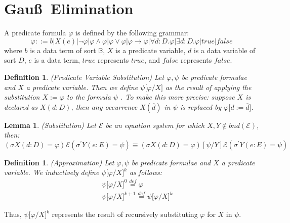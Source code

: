 \documentclass{article}
\newtheorem{definition}[theorem]{Definition}
\newtheorem{lemma}[theorem]{Lemma}
\begin{document}
\newpage

\section{Gau\ss\ Elimination}

A predicate formula $\varphi $ is defined by the following grammar:%
\begin{equation*}
\varphi ::=b|X(e)|\lnot \varphi |\varphi \wedge \varphi |\varphi \vee
\varphi |\varphi \rightarrow \varphi |\forall d:D.\varphi |\exists
d:D.\varphi |true |false
\end{equation*}%
where $b$ is a data term of sort $\mathbb{B}$, $X$ is a predicate variable, $%
d$ is a data variable of sort $D$, $e$ is a data term, $true $ represents $%
true$, and $false $ represents $false$.

\begin{definition}
(Predicate Variable Substitution) Let $\varphi ,\psi $ be predicate formulae
and $X$ a predicate variable. Then we define $\psi \lbrack \varphi /X]$ as
the result of applying the substitution $X:=\varphi $ to the formula $\psi $%
. To make this more precise: suppose $X$ is declared as $X(d:D)$, then any
occurrence $X(\overline{d})$ in $\psi $ is replaced by $\varphi \lbrack d:=%
\overline{d}]$.
\end{definition}

\begin{lemma}
(Substitution) Let $\mathcal{E}$ be an equation system for which $X,Y\notin
bnd(\mathcal{E})$, then:%
\begin{equation*}
(\sigma X(d:D)=\varphi )\mathcal{E}(\sigma ^{\prime }Y(e:E)=\psi )\equiv
(\sigma X(d:D)=\varphi )[\psi /Y]\mathcal{E}(\sigma ^{\prime }Y(e:E)=\psi )
\end{equation*}
\end{lemma}

\begin{definition}
(Approximation) Let $\varphi ,\psi $ be predicate formulae and $X$ a
predicate variable. We inductively define $\psi \lbrack \varphi /X]^{k}$ as
follows:%
\begin{eqnarray*}
&&\psi \lbrack \varphi /X]^{0}\overset{def}{=}\varphi \\
&&\psi \lbrack \varphi /X]^{k+1}\overset{def}{=}\psi \lbrack \varphi /X]^{k}
\end{eqnarray*}
\end{definition}

Thus, $\psi \lbrack \varphi /X]^{k}$ represents the result of recursively
substituting $\varphi $ for $X$ in $\psi $.
\end{document}
